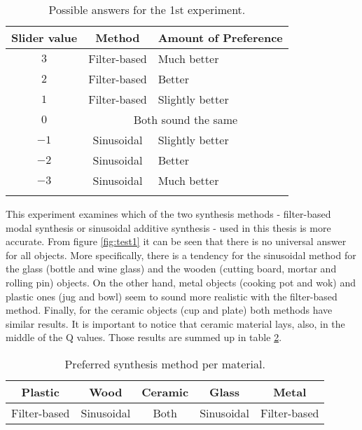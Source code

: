 \begin{table}[H]
	\centering
    \begin{tabular}{ c  c  l  }
    \toprule
    \textbf{Slider value} & \textbf{Method} & \textbf{Amount of Preference} \\ \toprule
    \addlinespace
    $3$ & Filter-based & Much better  \\
    $2$ & Filter-based & Better \\
    $1$ & Filter-based & Slightly better \\ 
    \addlinespace
    $0$ & \multicolumn{2}{c}{Both sound the same} \\
    \addlinespace
    $-1$ & Sinusoidal & Slightly better \\ 
    $-2$ & Sinusoidal & Better \\ 
    $-3$ & Sinusoidal & Much better \\
    \addlinespace
    \bottomrule
    \end{tabular}
    \caption{Possible answers for the 1st experiment.}
    \label{tab:test1_ans}
\end{table}  

This experiment examines which of the two synthesis methods - filter-based modal synthesis or sinusoidal additive synthesis - used in this thesis is more accurate. From figure \ref{fig:test1} it can be seen that there is no universal answer for all objects. More specifically, there is a tendency for the sinusoidal method for the glass (bottle and wine glass) and the wooden (cutting board, mortar and rolling pin) objects. On the other hand, metal objects (cooking pot and wok) and plastic ones (jug and bowl) seem to sound more realistic with the filter-based method. Finally, for the ceramic objects (cup and plate) both methods have similar results. It is important to notice that ceramic material lays, also, in the middle of the \gls{Q} values. Those results are summed up in table \ref{tab:method_mat}.

\begin{table}[H]
	\centering
    \begin{tabular}{ c  c  c c c }
    \toprule
    \textbf{Plastic} & \textbf{Wood} & \textbf{Ceramic} & \textbf{Glass} & \textbf{Metal} \\ \toprule
    Filter-based & Sinusoidal & Both & Sinusoidal & Filter-based  \\
    \bottomrule
    \end{tabular}
    \caption{Preferred synthesis method per material.}
    \label{tab:method_mat}
\end{table} 

